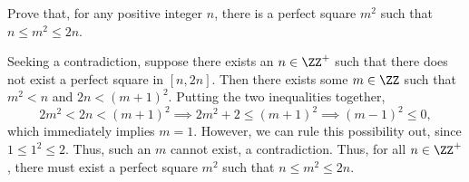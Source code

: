 \begin{problem}
    Prove that, for any positive integer $n$, there is a perfect square $m^2$ such that $n \leq m^2 \leq 2n$.
\end{problem}
\begin{solution}
    Seeking a contradiction, suppose there exists an $n \in \ZZ^+$ such that there does not exist a perfect square in $[n, 2n]$. Then there exists some $m \in \ZZ$ such that $m^2 < n$ and $2n < (m+1)^2$. Putting the two inequalities together, \[2m^2 < 2n < (m+1)^2 \implies 2m^2 + 2\leq (m+1)^2 \implies (m-1)^2 \leq 0,\] which immediately implies $m = 1$. However, we can rule this possibility out, since $1 \leq 1^2 \leq 2$. Thus, such an $m$ cannot exist, a contradiction. Thus, for all $n \in \ZZ^+$, there must exist a perfect square $m^2$ such that $n \leq m^2 \leq 2n$.
\end{solution}


